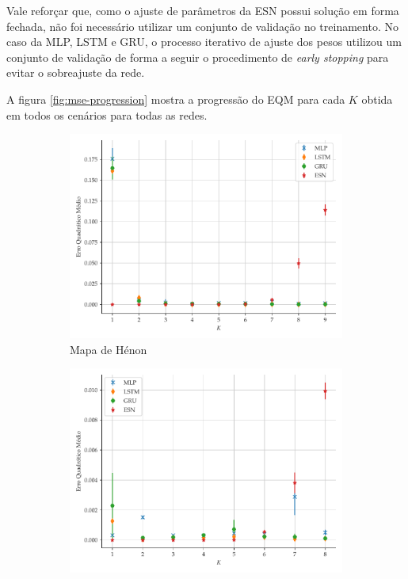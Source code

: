 \documentclass{article}
\begin{document}
Vale reforçar que, como o ajuste de parâmetros da ESN possui solução em forma fechada, não foi necessário utilizar um conjunto de validação no treinamento. No caso da MLP, LSTM e GRU, o processo iterativo de ajuste dos pesos utilizou um conjunto de validação de forma a seguir o procedimento de \textit{early stopping} para evitar o sobreajuste da rede.

A figura \ref{fig:mse-progression} mostra a progressão do EQM para cada $K$ obtida em todos os cenários para todas as redes. 
\begin{figure}[H]
     \begin{subfigure}[t]{0.2\textwidth}
         \includegraphics[scale=0.2]{progressao-k-henon.pdf}
         \caption{Mapa de Hénon}
     \end{subfigure}
     \centering
     \begin{subfigure}[t]{0.2\textwidth} 
         \includegraphics[scale=0.2]{progressao-k-logistic.pdf}

\end{subfigure}
\end{figure}
\end{document}
